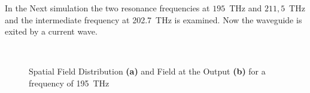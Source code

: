 In the Next simulation the two resonance frequencies at $195$~THz and $211,5$~THz and the intermediate frequency at 202.7~THz is examined. Now the waveguide is exited by a current wave. 



\newpage
\begin{figure}%
\centering
	\\%
\caption{Spatial Field Distribution \textbf{(a)} and Field at the Output \textbf{(b)} for a frequency of 195~THz}%
\label{fig:3TE}%
\end{figure}

